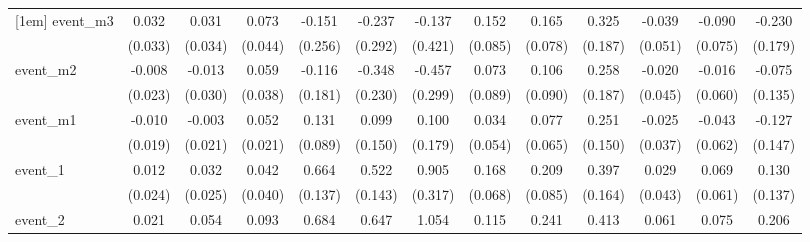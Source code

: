 {\begin{tabular}{l*{12}{c}}
[1em]
event\_m3    &       0.032         &       0.031         &       0.073         &      -0.151         &      -0.237         &      -0.137         &       0.152         &       0.165\sym{*}  &       0.325         &      -0.039         &      -0.090         &      -0.230         \\
            &     (0.033)         &     (0.034)         &     (0.044)         &     (0.256)         &     (0.292)         &     (0.421)         &     (0.085)         &     (0.078)         &     (0.187)         &     (0.051)         &     (0.075)         &     (0.179)         \\
[1em]
event\_m2    &      -0.008         &      -0.013         &       0.059         &      -0.116         &      -0.348         &      -0.457         &       0.073         &       0.106         &       0.258         &      -0.020         &      -0.016         &      -0.075         \\
            &     (0.023)         &     (0.030)         &     (0.038)         &     (0.181)         &     (0.230)         &     (0.299)         &     (0.089)         &     (0.090)         &     (0.187)         &     (0.045)         &     (0.060)         &     (0.135)         \\
[1em]
event\_m1    &      -0.010         &      -0.003         &       0.052\sym{*}  &       0.131         &       0.099         &       0.100         &       0.034         &       0.077         &       0.251         &      -0.025         &      -0.043         &      -0.127         \\
            &     (0.019)         &     (0.021)         &     (0.021)         &     (0.089)         &     (0.150)         &     (0.179)         &     (0.054)         &     (0.065)         &     (0.150)         &     (0.037)         &     (0.062)         &     (0.147)         \\
[1em]
event\_1     &       0.012         &       0.032         &       0.042         &       0.664\sym{***}&       0.522\sym{***}&       0.905\sym{**} &       0.168\sym{*}  &       0.209\sym{*}  &       0.397\sym{*}  &       0.029         &       0.069         &       0.130         \\
            &     (0.024)         &     (0.025)         &     (0.040)         &     (0.137)         &     (0.143)         &     (0.317)         &     (0.068)         &     (0.085)         &     (0.164)         &     (0.043)         &     (0.061)         &     (0.137)         \\
[1em]
event\_2     &       0.021         &       0.054\sym{*}  &       0.093\sym{*}  &       0.684\sym{**} &       0.647\sym{**} &       1.054\sym{**} &       0.115         &       0.241\sym{*}  &       0.413\sym{**} &       0.061         &       0.075         &       0.206\sym{*}  \\

\end{tabular}}

